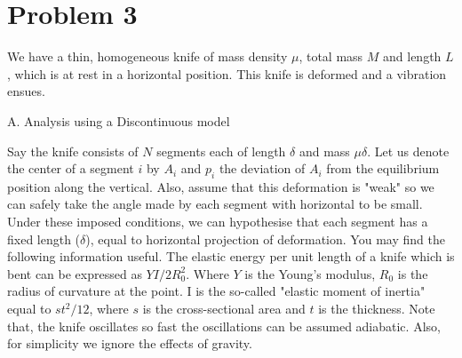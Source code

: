 
\section*{Problem 3}
\begin{problem}{}
We have a thin, homogeneous knife of mass density $\mu$, total mass $M$ and length $L$, which is at rest in a horizontal position. This knife is deformed and a vibration ensues. 
\end{problem}
\begin{problem}{A. Analysis using a Discontinuous model}

Say the knife consists of $N$ segments each of length $\delta$ and mass $\mu \delta$. Let us denote the center of a segment $i$ by $A_i$ and $p_i$ the deviation of $A_i$ from the equilibrium position along the vertical. Also, assume that this deformation is "weak" so we can safely take the angle made by each segment with horizontal to be small. Under these imposed conditions, we can hypothesise that each segment has a fixed length ($\delta$), equal to horizontal projection of deformation. 
\newline
You may find the following information useful. The elastic energy per unit length of a knife which is bent can be expressed as $YI/2R_0^2$. Where $Y$ is the Young's modulus,  $R_0$ is the radius of curvature at the point. I is the so-called "elastic moment of inertia" equal to $st^2/12$, where $s$ is the cross-sectional area and $t$ is the thickness.
\newline
Note that, the knife oscillates so fast the oscillations can be assumed adiabatic. Also, for simplicity we ignore the effects of gravity.
\begin{center}
    


\begin{tikzpicture}[x=0.75pt,y=0.75pt,yscale=-1,xscale=1]


\end{tikzpicture}
\end{center}
\end{problem}
